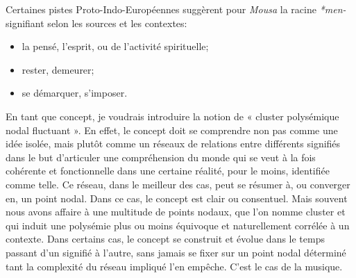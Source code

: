 Certaines pistes Proto-Indo-Européennes suggèrent pour \textit{Mousa} la racine \textit{*men-} signifiant selon les sources et les contextes:
\begin{itemize}
\item la pensé,  l'esprit, ou de l'activité spirituelle;
\item rester, demeurer;
\item se démarquer, s'imposer.
\end{itemize}

\bigskip

En tant que concept, je voudrais introduire la notion de « cluster polysémique nodal fluctuant ». En effet, le concept doit se comprendre non pas comme une idée isolée, mais plutôt comme un réseaux de relations entre différents signifiés dans le but d'articuler une compréhension du monde qui se veut à la fois cohérente et fonctionnelle dans une certaine réalité, pour le moins, identifiée comme telle. Ce réseau, dans le meilleur des cas, peut se résumer à, ou converger en, un point nodal. Dans ce cas, le concept est clair ou consentuel. Mais souvent nous avons affaire à une multitude de points nodaux, que l'on nomme cluster et qui induit une  polysémie plus ou moins équivoque et naturellement corrélée à un contexte. 
Dans certains cas, le concept se construit et évolue dans le temps passant d'un signifié à l'autre, sans jamais se fixer sur un point nodal déterminé tant la complexité du réseau impliqué l'en empêche. C'est le cas de la musique.

